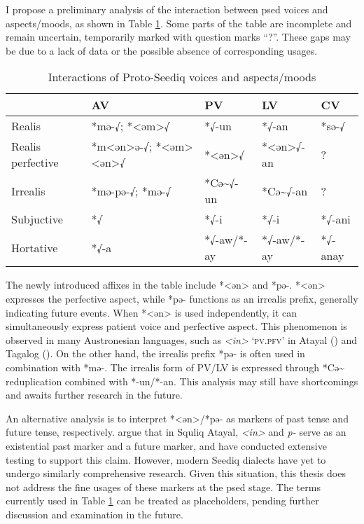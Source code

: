 I propose a preliminary analysis of the interaction between \acl{psed} voices and aspects/moods, as shown in Table \ref{tab:psed_voice_tam}. Some parts of the table are incomplete and remain uncertain, temporarily marked with question marks ``?''. These gaps may be due to a lack of data or the possible absence of corresponding usages.

\begin{table}[!htbp]
\centering
\caption{Interactions of Proto-Seediq voices and aspects/moods}
\label{tab:psed_voice_tam}
\begin{tabular}{lllll}
\hline
                  & AV                    & PV            & LV             & CV      \\ \hline
Realis            & *mə-√; *<əm>√         & *√-un         & *√-an          & *sə-√   \\
Realis perfective & *m<ən>ə-√; *<əm><ən>√ & *<ən>√        & *<ən>√-an      & ?       \\
Irrealis          & *mə-pə-√; *mə-√       & *Cə\~{}√-un   & *Cə\~{}√-an    & ?       \\
Subjuctive        & *√                    & *√-i          & *√-i           & *√-ani  \\
Hortative         & *√-a                  & *√-aw/*-ay    & *√-aw/*-ay     & *√-anay \\ \hline
\end{tabular}
\end{table}

The newly introduced affixes in the table include *<ən> and *pə-. *<ən> expresses the perfective aspect, while *pə- functions as an irrealis prefix, generally indicating future events. When *<ən> is used independently, it can simultaneously express patient voice and perfective aspect. This phenomenon is observed in many Austronesian languages, such as \textit{<in>} `\textsc{pv.pfv}' in Atayal (\cite{huang1995}) and Tagalog (\cite{schachter_otanes1972tagalog}). On the other hand, the irrealis prefix *pə- is often used in combination with *mə-. The irrealis form of PV/LV is expressed through *Cə\~{} reduplication combined with *-un/*-an. This analysis may still have shortcomings and awaits further research in the future.

An alternative analysis is to interpret *<ən>/*pə- as markers of past tense and future tense, respectively. \textcite{chen2018, chen2024} argue that in Squliq Atayal, \textit{<in>} and \textit{p-} serve as an existential past marker and a future marker, and have conducted extensive testing to support this claim. However, modern Seediq dialects have yet to undergo similarly comprehensive research. Given this situation, this thesis does not address the fine usages of these markers at the \acl{psed} stage. The terms currently used in Table \ref{tab:psed_voice_tam} can be treated as placeholders, pending further discussion and examination in the future.

